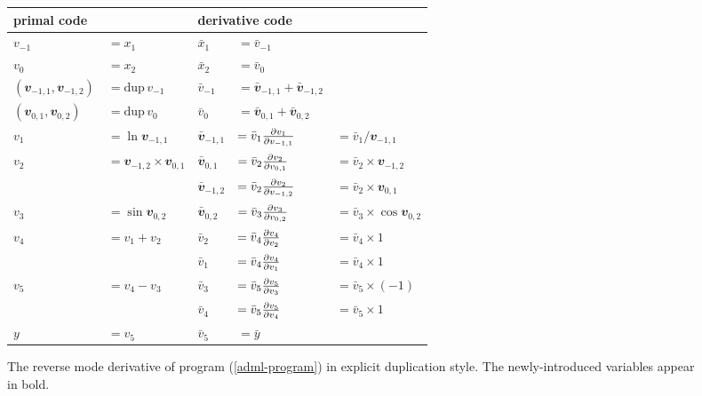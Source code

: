 \documentclass[12pt]{article}
\newcommand{\dup}{\mathrm{dup}}
\begin{document}
\begin{figure}[t]
\center
\begin{tabular}[t]{ll|lll}

  \multicolumn{2}{l|}{primal code}
  &
  \multicolumn{3}{l}{derivative code}
  \\

  \hline

  $v_{-1}$ & $= x_1$
  &
  $\bar{x}_1$ & $= \bar{v}_{-1}$
  \\
  
  $v_{0}$ & $= x_2$
  &
  $\bar{x}_2$ & $= \bar{v}_{0}$
  \\

  \hline

  \((\mathbfit{v}_{-1,1}, \mathbfit{v}_{-1,2})\) & \(= \dup \, v_{-1}\)
  &
  \(\bar{v}_{-1}\) & \(= \bar{\mathbfit{v}}_{-1,1} + \bar{\mathbfit{v}}_{-1,2}\)
  \\

  \((\mathbfit{v}_{0,1}, \mathbfit{v}_{0,2})\) & \(= \dup \, v_0\)
  &
  \(\bar{v}_{0}\) & \(= \bar{\mathbfit{v}}_{0,1} + \bar{\mathbfit{v}}_{0,2}\)
  \\

  $v_1$ & $= \ln{\mathbfit{v}_{-1,1}}$
  &
  \(\bar{\mathbfit{v}}_{-1,1}\)
  & \(
  = \bar{v}_{1} \frac{\partial v_{1}}{\partial v_{-1,1}}\)
  & \(
  = \bar{v}_1 / \mathbfit{v}_{-1,1}
  \) \\

  $v_2$ & $= \mathbfit{v}_{-1,2} \times \mathbfit{v}_{0,1}$
  &
  \(\bar{\mathbfit{v}}_{0,1}\)
  & \(
  = \bar{v}_{2} \frac{\partial v_{2}}{\partial v_{0,1}}\)
  & \(
  = \bar{v}_2 \times \mathbfit{v}_{-1,2}
  \) \\

  & &
  \(\bar{\mathbfit{v}}_{-1,2}\)
  &
  \(= \bar{v}_{2} \frac{\partial v_{2}}{\partial v_{-1,2}}\)
  & \(
  = \bar{v}_2 \times \mathbfit{v}_{0,1}
  \) \\

  $v_3$ & $= \sin{\mathbfit{v}_{0,2}}$
  &
  \(\bar{\mathbfit{v}}_{0,2}\)
  & \(
  = \bar{v}_{3} \frac{\partial v_{3}}{\partial v_{0,2}}\)
  & \(
  = \bar{v}_3 \times \cos \mathbfit{v}_{0,2}
  \) \\

  $v_4$ & $= v_1 + v_2$
  &
  \(\bar{v}_2\)
  & \(
  = \bar{v}_{4} \frac{\partial v_{4}}{\partial v_{2}}\)
  & \(
  = \bar{v}_4 \times 1
  \) \\

  & &
  \(\bar{v}_1\)
  &
  \(= \bar{v}_{4} \frac{\partial v_{4}}{\partial v_{1}}\)
  & \(
  = \bar{v}_4 \times 1
  \) \\

  $v_5$ & $= v_4 - v_3$
  &
  \(\bar{v}_3\)
  & \(
  = \bar{v}_{5} \frac{\partial v_{5}}{\partial v_{3}}\)
  & \(
  = \bar{v}_5 \times (-1)
  \) \\
  
  & &
  \(\bar{v}_4\)
  & \(
  = \bar{v}_{5} \frac{\partial v_{5}}{\partial v_{4}}\)
  & \(
  = \bar{v}_5 \times 1
  \) \\
  
  \hline

  $y$ & $= v_5$
  &
  $\bar{v}_5$ & $= \bar{y}$
  \\

\end{tabular}
\caption{\label{adml-diff-dup} The reverse mode derivative of program
  (\ref{adml-program}) in explicit duplication style.  The
  newly-introduced variables appear in bold.}
\end{figure}
\end{document}
